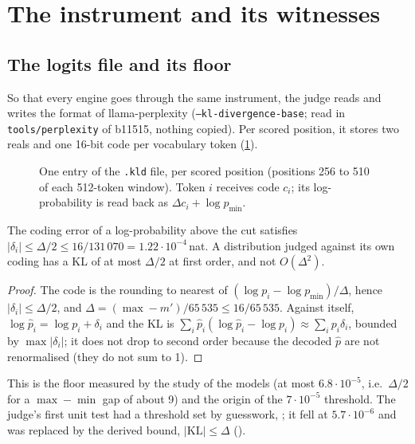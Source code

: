 \section{The instrument and its witnesses}\label{sec:t2r-instrument}

\subsection{The logits file and its floor}\label{sec:t2r-kld}

So that every engine goes through the same instrument, the judge reads and writes the format of llama-perplexity (\texttt{--kl-divergence-base}; read in \texttt{tools/perplexity} of b11515, nothing copied). Per scored position, it stores two reals and one 16-bit code per vocabulary token (\cref{fig:t2r-kld}).

\begin{figure}[ht]
\centering
\SchemaRefKld
\caption[One entry of the .kld file, bit for bit]{One entry of the \texttt{.kld} file, per scored position (positions 256 to 510 of each 512-token window). Token $i$ receives code $c_i$; its log-probability is read back as $\Delta c_i + \log p_{\min}$.}
\label{fig:t2r-kld}
\end{figure}

\begin{lemme}\label{lem:t2r-plancher}
The coding error of a log-probability above the cut satisfies $|\delta_i| \le \Delta/2 \le 16/131\,070 = 1.22\cdot10^{-4}$\,nat. A distribution judged against its own coding has a KL of at most $\Delta/2$ at first order, and not $O(\Delta^2)$.
\end{lemme}

\begin{proof}
The code is the rounding to nearest of $(\log p_i - \log p_{\min})/\Delta$, hence $|\delta_i| \le \Delta/2$, and $\Delta = (\max - m')/65\,535 \le 16/65\,535$. Against itself, $\log\hat p_i = \log p_i + \delta_i$ and the KL is $\sum_i \hat p_i(\log \hat p_i - \log p_i) \approx \sum_i p_i\delta_i$, bounded by $\max|\delta_i|$; it does not drop to second order because the decoded $\hat p$ are not renormalised (they do not sum to 1).
\end{proof}

This is the floor measured by the study of the models (at most $6.8\cdot10^{-5}$, i.e.\ $\Delta/2$ for a $\max - \min$ gap of about 9) and the origin of the $7\cdot10^{-5}$ threshold. The judge's first unit test had a threshold set by guesswork, ; it fell at $5.7\cdot10^{-6}$ and was replaced by the derived bound, $|\mathrm{KL}| \le \Delta$ ().

